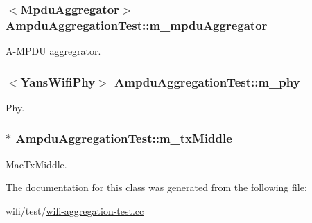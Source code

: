 \subsubsection[{\texorpdfstring{m\+\_\+mpdu\+Aggregator}{m_mpduAggregator}}]{$<${\bf Mpdu\+Aggregator}$>$ Ampdu\+Aggregation\+Test\+::m\+\_\+mpdu\+Aggregator\hspace{0.3cm}{\ttfamily [private]}}\hypertarget{classAmpduAggregationTest_aa98ac82d3471dd1133359921810bf284}{}\label{classAmpduAggregationTest_aa98ac82d3471dd1133359921810bf284}


A-\/\+M\+P\+DU aggregrator. 

\subsubsection[{\texorpdfstring{m\+\_\+phy}{m_phy}}]{$<${\bf Yans\+Wifi\+Phy}$>$ Ampdu\+Aggregation\+Test\+::m\+\_\+phy\hspace{0.3cm}{\ttfamily [private]}}\hypertarget{classAmpduAggregationTest_a220a24ff11749ab912f7c13b50132b5c}{}\label{classAmpduAggregationTest_a220a24ff11749ab912f7c13b50132b5c}


Phy. 

\subsubsection[{\texorpdfstring{m\+\_\+tx\+Middle}{m_txMiddle}}]{$\ast$ Ampdu\+Aggregation\+Test\+::m\+\_\+tx\+Middle\hspace{0.3cm}{\ttfamily [private]}}\hypertarget{classAmpduAggregationTest_a69145cfecbe5625743bb6165b99e5069}{}\label{classAmpduAggregationTest_a69145cfecbe5625743bb6165b99e5069}


Mac\+Tx\+Middle. 



The documentation for this class was generated from the following file\+:\begin{DoxyCompactItemize}
\item 
wifi/test/\hyperlink{wifi-aggregation-test_8cc}{wifi-\/aggregation-\/test.\+cc}\end{DoxyCompactItemize}
